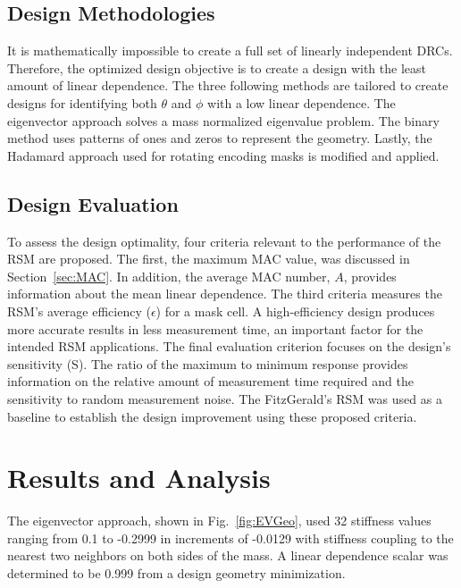 \documentclass[twocolumn,10pt,final]{asme2ej}
\begin{document}
\vspace{-0.2 cm}
\subsection{Design Methodologies} \label{design-methods}
It is mathematically impossible to create a full set of linearly independent DRCs.  
Therefore, the optimized design objective is to create a design with the least amount of linear dependence.  
The three following methods are tailored to create designs for identifying both $\theta$ and $\phi$ with a low linear dependence.  
The eigenvector approach solves a mass normalized eigenvalue problem.  
The binary method uses patterns of ones and zeros to represent the geometry.
Lastly, the Hadamard approach used for rotating encoding masks is modified and applied.

\vspace{-0.2 cm}
\subsection{Design Evaluation}
\label{sec:Eval}
To assess the design optimality, four criteria relevant to the performance of the RSM are proposed.  The first, the maximum MAC value, was discussed in Section~\ref{sec:MAC}.  
In addition, the average MAC number, $A$, provides information about the mean linear dependence.  
The third criteria measures the RSM's average efficiency ($\epsilon$) for a mask cell. 
A high-efficiency design produces more accurate results in less measurement time, an important factor for the intended RSM applications.  
The final evaluation criterion focuses on the design's sensitivity (S).  
The ratio of the maximum to minimum response provides information on the relative amount of measurement time required and the  sensitivity to random measurement noise.
The FitzGerald's RSM was used as a baseline to establish the design improvement using these proposed criteria.  

\vspace{-0.3 cm}
\section{Results and Analysis}
The eigenvector approach, shown in Fig.~\ref{fig:EVGeo}, used 32 stiffness values ranging from 0.1 to -0.2999 in increments of -0.0129 with stiffness coupling to the nearest two neighbors on both sides of the mass.
A linear dependence scalar was determined to be 0.999 from a design geometry minimization.
\end{document}
